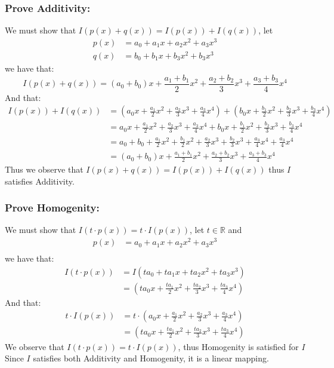 \documentclass{article}
\begin{document}
\subsubsection*{Prove Additivity:}


We must show that $I(p(x)+q(x))=I(p(x))+I(q(x))$, let $$\begin{aligned}
    p(x)&=a_{0}+a_{1}x+a_{2}x^{2}+a_{3}x^{3}\\
    q(x)&=b_{0}+b_{1}x+b_{3}x^{2}+b_{3}x^{3}
\end{aligned}$$we have that: $$I(p(x)+q(x))=(a_{0}+b_{0})x+\frac{a_{1}+b_{1}}{2}x^{2}+\frac{a_{2}+b_{2}}{3}x^{3}+\frac{a_{3}+b_{3}}{4}x^{4}$$
And that: $$\begin{aligned}
   I(p(x))+I(q(x))&=(a_{0}x+\frac{a_{1}}{2}x^{2}+\frac{a_{2}}{3}x^{3}+\frac{a_{3}}{4}x^{4})+(b_{0}x+\frac{b_{1}}{2}x^{2}+\frac{b_{2}}{3}x^{3}+\frac{b_{3}}{4}x^{4})\\
   &=a_{0}x+\frac{a_{1}}{2}x^{2}+\frac{a_{2}}{3}x^{3}+\frac{a_{3}}{4}x^{4}+b_{0}x+\frac{b_{1}}{2}x^{2}+\frac{b_{2}}{3}x^{3}+\frac{b_{3}}{4}x^{4}\\
   &=a_{0}+b_{0}+\frac{a_{1}}{2}x^{2}+\frac{b_{1}}{2}x^{2}+\frac{a_{2}}{3}x^{3}+\frac{b_{2}}{3}x^{3}+\frac{a_{3}}{4}x^{4}+\frac{a_{3}}{4}x^{4}\\
   &=(a_{0}+b_{0})x+\frac{a_{1}+b_{1}}{2}x^{2}+\frac{a_{2}+b_{2}}{3}x^{3}+\frac{a_{3}+b_{3}}{4}x^{4}
\end{aligned}$$
Thus we observe that $I(p(x)+q(x))=I(p(x))+I(q(x))$ thus $I$ satisfies Additivity.
\subsubsection*{Prove Homogenity:}
We must show that $I(t\cdot p(x))=t\cdot I(p(x))$, let $t\in\mathbb{R}$ and $$\begin{aligned}
    p(x)&=a_{0}+a_{1}x+a_{2}x^{2}+a_{3}x^{3}\\
\end{aligned}$$we have that:$$\begin{aligned}
   I(t\cdot p(x))&=I(ta_{0}+ta_{1}x+ta_{2}x^{2}+ta_{3}x^{3})\\
&=(ta_{0}x+\frac{ta_{1}}{2}x^{2}+\frac{ta_{2}}{3}x^{3}+\frac{ta_{3}}{4}x^{4})
\end{aligned}$$
And that: $$\begin{aligned}
    t\cdot I(p(x))&=t\cdot (a_{0}x+\frac{a_{1}}{2}x^{2}+\frac{a_{2}}{3}x^{3}+\frac{a_{3}}{4}x^{4})\\
    &=(ta_{0}x+\frac{ta_{1}}{2}x^{2}+\frac{ta_{2}}{3}x^{3}+\frac{ta_{3}}{4}x^{4})
\end{aligned}$$
We observe that $I(t\cdot p(x))=t\cdot I(p(x))$, thus Homogenity is satisfied for $I$\\
Since $I$ satisfies both Additivity and Homogenity, it is a linear mapping.
\end{document}

